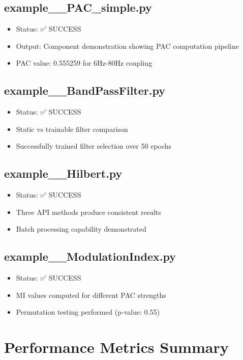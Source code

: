\documentclass[11pt,a4paper]{article}
\begin{document}
\subsection{example\_\_PAC\_simple.py}
\begin{itemize}
\item Status: ✅ SUCCESS
\item Output: Component demonstration showing PAC computation pipeline
\item PAC value: 0.555259 for 6Hz-80Hz coupling
\end{itemize}

\subsection{example\_\_BandPassFilter.py}
\begin{itemize}
\item Status: ✅ SUCCESS
\item Static vs trainable filter comparison
\item Successfully trained filter selection over 50 epochs
\end{itemize}

\subsection{example\_\_Hilbert.py}
\begin{itemize}
\item Status: ✅ SUCCESS
\item Three API methods produce consistent results
\item Batch processing capability demonstrated
\end{itemize}

\subsection{example\_\_ModulationIndex.py}
\begin{itemize}
\item Status: ✅ SUCCESS
\item MI values computed for different PAC strengths
\item Permutation testing performed (p-value: 0.55)
\end{itemize}

\section{Performance Metrics Summary}
\end{document}
